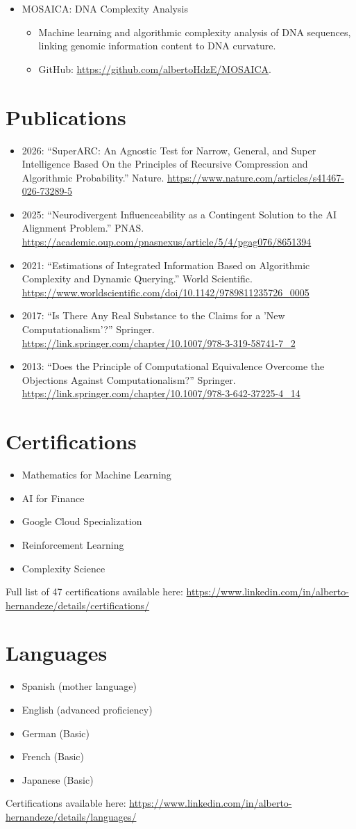 \documentclass{article}
\begin{document}
\begin{itemize}
\item \hypertarget{proj-mosaica}{}MOSAICA: DNA Complexity Analysis
\begin{itemize}
\item Machine learning and algorithmic complexity analysis of DNA sequences, linking genomic information content to DNA curvature.
\item GitHub: \url{https://github.com/albertoHdzE/MOSAICA}.
\end{itemize}
\end{itemize}

\section{Publications}
\begin{itemize}
\item 2026: ``SuperARC: An Agnostic Test for Narrow, General, and Super Intelligence Based On the Principles of Recursive Compression and Algorithmic Probability.'' Nature. \url{https://www.nature.com/articles/s41467-026-73289-5}
\item 2025: ``Neurodivergent Influenceability as a Contingent Solution to the AI Alignment Problem.'' PNAS. \url{https://academic.oup.com/pnasnexus/article/5/4/pgag076/8651394}
\item 2021: ``Estimations of Integrated Information Based on Algorithmic Complexity and Dynamic Querying.'' World Scientific. \url{https://www.worldscientific.com/doi/10.1142/9789811235726_0005}
\item 2017: ``Is There Any Real Substance to the Claims for a 'New Computationalism'?'' Springer. \url{https://link.springer.com/chapter/10.1007/978-3-319-58741-7_2}
\item 2013: ``Does the Principle of Computational Equivalence Overcome the Objections Against Computationalism?'' Springer. \url{https://link.springer.com/chapter/10.1007/978-3-642-37225-4_14}
\end{itemize}

\section{Certifications}
\begin{itemize}
\item Mathematics for Machine Learning
\item AI for Finance
\item Google Cloud Specialization
\item Reinforcement Learning
\item Complexity Science
\end{itemize}
Full list of 47 certifications available here: \url{https://www.linkedin.com/in/alberto-hernandeze/details/certifications/}

\section{Languages}
\begin{itemize}
\item Spanish (mother language)
\item English (advanced proficiency)
\item German (Basic)
\item French (Basic)
\item Japanese (Basic)
\end{itemize}
Certifications available here: \url{https://www.linkedin.com/in/alberto-hernandeze/details/languages/}
\end{document}
